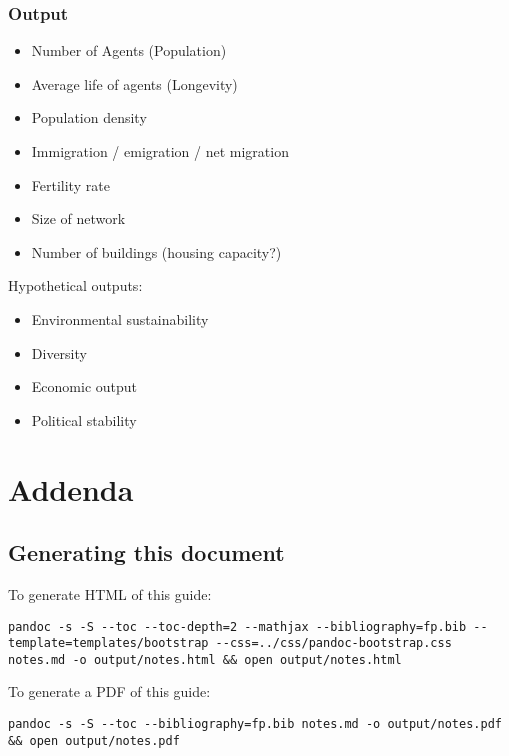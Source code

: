 \documentclass[]{article}
\begin{document}
\subsubsection{Output}\label{output}

\begin{itemize}
\itemsep1pt\parskip0pt
\item
  Number of Agents (Population)
\item
  Average life of agents (Longevity)
\item
  Population density
\item
  Immigration / emigration / net migration
\item
  Fertility rate
\item
  Size of network
\item
  Number of buildings (housing capacity?)
\end{itemize}

Hypothetical outputs:

\begin{itemize}
\itemsep1pt\parskip0pt
\item
  Environmental sustainability
\item
  Diversity
\item
  Economic output
\item
  Political stability
\end{itemize}

\section{Addenda}\label{addenda}

\subsection{Generating this document}\label{generating-this-document}

To generate HTML of this guide:

\begin{verbatim}
pandoc -s -S --toc --toc-depth=2 --mathjax --bibliography=fp.bib --template=templates/bootstrap --css=../css/pandoc-bootstrap.css notes.md -o output/notes.html && open output/notes.html
\end{verbatim}

To generate a PDF of this guide:

\begin{verbatim}
pandoc -s -S --toc --bibliography=fp.bib notes.md -o output/notes.pdf && open output/notes.pdf
\end{verbatim}
\end{document}
